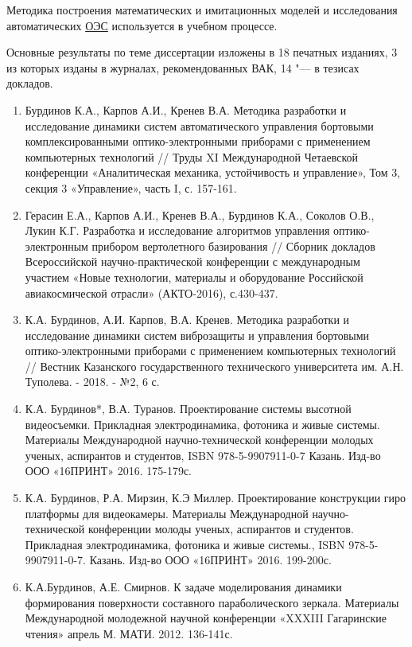 Методика построения математических и имитационных моделей и исследования автоматических  \hyperref[acroEOS]{ОЭС} используется в учебном процессе.
\begin{comment}
{\contribution} \todo{Автор принимал активное участие} \ldots
\end{comment}
{\publications} Основные результаты по теме диссертации изложены в 18 печатных изданиях,
    3 из которых изданы в журналах, рекомендованных ВАК,
    14 "--- в тезисах докладов.
    
\begin{enumerate}
  \item Бурдинов К.А., Карпов А.И., Кренев В.А.   Методика разработки и исследование динамики систем автоматического управления бортовыми комплексированными оптико-электронными приборами с применением компьютерных технологий // Труды XI Международной Четаевской конференции «Аналитическая механика, устойчивость и управление», Том 3, секция 3 «Управление», часть I, с. 157-161.
  \item Герасин Е.А., Карпов А.И., Кренев В.А., Бурдинов К.А., Соколов О.В., Лукин К.Г. Разработка и исследование алгоритмов управления оптико-электронным прибором вертолетного базирования // Сборник докладов Всероссийской научно-практической конференции с международным участием «Новые технологии, материалы и оборудование Российской авиакосмической отрасли» (АКТО-2016), с.430-437.
  \item К.А. Бурдинов, А.И. Карпов, В.А. Кренев. Методика разработки и исследование динамики систем виброзащиты и управления бортовыми оптико-электронными приборами с применением компьютерных технологий // Вестник Казанского государственного технического университета им. А.Н. Туполева. - 2018. - №2, 6 с.
  \item К.А. Бурдинов*, В.А. Туранов. Проектирование системы высотной видеосъемки. Прикладная электродинамика, фотоника и живые системы. Материалы Международной научно-технической конференции молодых ученых, аспирантов и студентов, ISBN 978-5-9907911-0-7
Казань. Изд-во ООО «16ПРИНТ» 2016. 175-179с.
  \item К.А. Бурдинов, Р.А. Мирзин, К.Э Миллер. Проектирование конструкции гиро платформы для видеокамеры. Материалы Международной научно-технической конференции молоды ученых, аспирантов и студентов. Прикладная электродинамика, фотоника и живые системы., ISBN 978-5-9907911-0-7. Казань. Изд-во ООО «16ПРИНТ» 2016. 199-200с.
  \item К.А.Бурдинов, А.Е. Смирнов. К задаче моделирования динамики формирования поверхности составного параболического зеркала. Материалы Международной молодежной научной конференции «XXXIII Гагаринские чтения» апрель М. МАТИ. 2012. 136-141с.

\end{enumerate}
